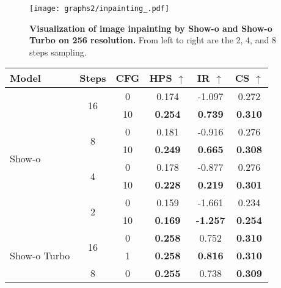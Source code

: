\begin{figure}[h]
    \centering
    \texttt{[image: graphs2/inpainting\_.pdf]} 
    
    \caption{
            \small \textbf{Visualization of image inpainting by Show-o and Show-o Turbo on 256 resolution.} From left to right are the 2, 4, and 8 steps sampling.
    }
    \label{fig:inpainting}
\end{figure}

\begin{table}[h]
\centering
\setlength{\tabcolsep}{5pt}
\begin{tabular}{l c c c c c}
\toprule
\textbf{Model}        & \textbf{Steps} & \textbf{CFG}   & \textbf{HPS} \large$\uparrow$   & \textbf{IR} \large$\uparrow$    & \textbf{CS} \large$\uparrow$    \\ \midrule
\multirow{8}{*}{Show-o}       & \multirow{2}{*}{16}    & 0     & 0.174 & -1.097 & 0.272 \\
                            &                         & 10    & \textbf{0.254} & \textbf{0.739}  & \textbf{0.310} \\
                            \cline{2-6}
                            & \multirow{2}{*}{8}     & 0     & 0.181 & -0.916 & 0.276 \\
                            &                         & 10    & \textbf{0.249} & \textbf{0.665}  & \textbf{0.308} \\ 
                            \cline{2-6}
                            & \multirow{2}{*}{4}     & 0     & 0.178 & -0.877 & 0.276 \\
                            &                         & 10    & \textbf{0.228} & \textbf{0.219}  & \textbf{0.301} \\ 
                            \cline{2-6}
                            & \multirow{2}{*}{2}     & 0     & 0.159 & -1.661 & 0.234 \\
                            &                         & 10    & \textbf{0.169} & \textbf{-1.257} & \textbf{0.254} \\ \midrule
\multirow{8}{*}{Show-o Turbo} & \multirow{2}{*}{16}    & 0     & \textbf{0.258} & 0.752  & \textbf{0.310} \\
                            &                         & 1     & \textbf{0.258} & \textbf{0.816}  & \textbf{0.310} \\
                            \cline{2-6}
                            & \multirow{2}{*}{8}     & 0     & \textbf{0.255} & 0.738  & \textbf{0.309} \\

\end{tabular}
\end{table}
